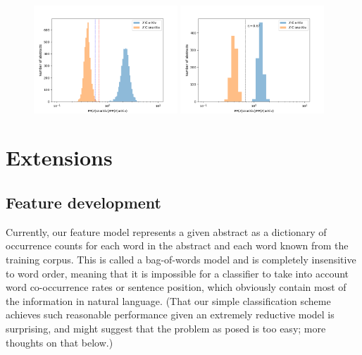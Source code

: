 \documentclass{article}
\begin{document}
\begin{figure}[!htbp]
\centering
	\includegraphics[width=0.48\textwidth]{../figures/BOW_histogram.png}
	\hfill
	\includegraphics[width=0.48\textwidth]{../figures/bigram_histogram.png}
\end{figure}




















\section{Extensions}
\subsection{Feature development}
Currently, our feature model represents a given abstract as a dictionary of occurrence counts for each word in the abstract and each word known from the training corpus.
This is called a bag-of-words model and is completely insensitive to word order, meaning that it is impossible for a classifier to take into account word co-occurrence rates or sentence position, which obviously contain most of the information in natural language.
(That our simple classification scheme achieves such reasonable performance given an extremely reductive model is surprising, and might suggest that the problem as posed is too easy; more thoughts on that below.)
\end{document}

